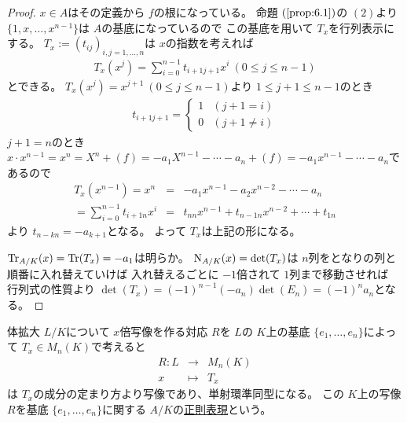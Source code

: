 \documentclass[../master_galois_theory]{subfiles}
\begin{document}
\begin{proof}
  $x \in A$はその定義から $f$の根になっている。
  命題 $(\mathrm{\ref{prop:6.1}})$の $(2)$より
  $\{ 1 , x , \dots , x^{n-1} \}$は $A$の基底になっているので
  この基底を用いて $T_x$を行列表示にする。
  $T_x := (t_{ij})_{i,j = 1 , \dots , n}$は $x$の指数を考えれば
  \begin{eqnarray*}
    T_x(x^j) = \sum_{i=0}^{n-1} t_{i+1 j+1} x^i \  (0 \leq j \leq n-1)
  \end{eqnarray*}
  とできる。
  $T_x(x^j) = x^{j+1} \  (0 \leq j \leq n-1)$より $1 \leq j+1 \leq n-1$のとき
  \begin{eqnarray*}
    t_{i+1 j+1} =
    \begin{cases}
      1 & (j+1 = i) \\
      0 & (j+1 \neq i)
    \end{cases}
  \end{eqnarray*}
  $j+1 = n$のとき $x \cdot x^{n-1} = x^n = X^n + (f) = -a_1 X^{n-1} - \cdots -a_n + (f) = -a_1 x^{n-1} - \cdots -a_n$であるので
  \begin{eqnarray*}
    T_x(x^{n-1}) = x^n & = & -a_1 x^{n-1} -a_2 x^{n-2} - \cdots -a_n \\
    = \sum_{i=0}^{n-1} t_{i+1 n} x^i & = & t_{n n} x^{n-1} + t_{n-1 n} x^{n-2} + \cdots + t_{1 n}
  \end{eqnarray*}
  より $t_{n-k n} = -a_{k+1}$となる。
  よって $T_x$は上記の形になる。

  $\mathrm{Tr}_{A/K}(x) = \mathrm{Tr}(T_x) = -a_1$は明らか。
  $\mathrm{N}_{A/K}(x) = \det(T_x)$は $n$列をとなりの列と順番に入れ替えていけば
  入れ替えるごとに $-1$倍されて $1$列まで移動させれば
  行列式の性質より $\det(T_x) = (-1)^{n-1} (-a_n) \det(E_n) = (-1)^n a_n$となる。
\end{proof}

\begin{prop}
  体拡大 $L/K$について
  $x$倍写像を作る対応 $R$を $L$の $K$上の基底 $\{ e_1 , \dots , e_n \}$によって $T_x \in M_n(K)$で考えると
  \begin{eqnarray*}
    R : L & \longrightarrow & M_n(K) \\
    x & \longmapsto & T_x
  \end{eqnarray*}
  は $T_x$の成分の定まり方より写像であり、単射環準同型になる。
  この $K$上の写像 $R$を基底 $\{ e_1 , \dots , e_n \}$に関する
  $A/K$の\underline{正則表現}という。
\end{prop}
\end{document}
